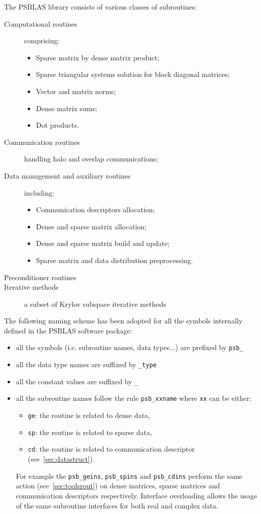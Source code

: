 The PSBLAS library consists of various classes of subroutines:
\begin{description}
\item[Computational routines] comprising:
\begin{itemize}
\item Sparse matrix by dense matrix product; 
\item Sparse triangular
systems solution for block diagonal matrices;
\item Vector and matrix norms;
\item Dense matrix sums;
\item Dot products.
\end{itemize} 
\item[Communication routines] handling halo and overlap
  communications;
\item[Data management and auxiliary routines] including:
\begin{itemize}
\item Communication descriptors allocation;
\item Dense and sparse matrix allocation;
\item Dense and sparse matrix build and update;
\item Sparse matrix and data distribution preprocessing.
\end{itemize} 
\item[Preconditioner routines]
\item[Iterative methods] a subset of Krylov subspace iterative
  methods
\end{description}
The following naming scheme has been adopted for all the symbols
internally defined in the PSBLAS software package:
\begin{itemize}
\item all the symbols (i.e. subroutine names, data types...) are
  prefixed by \verb|psb_| 
\item all the data type names are suffixed by \verb|_type|
\item all the constant values are suffixed by \verb|_|
\item all the subroutine names follow the rule \verb|psb_xxname| where
  \verb|xx| can be either:
  \begin{itemize}
  \item \verb|ge|: the routine is related to dense data, 
  \item \verb|sp|: the routine is related to sparse data, 
  \item \verb|cd|: the routine is related to communication descriptor (see~\ref{sec:datastruct}).
  \end{itemize}
  For example the \verb|psb_geins|, \verb|psb_spins| and
  \verb|psb_cdins| perform the same action (see~\ref{sec:toolsrout}) on
  dense matrices, sparse matrices and communication descriptors
  respectively.
  Interface overloading allows the usage of the same subroutine
  interfaces for both real and complex data.
\end{itemize}
